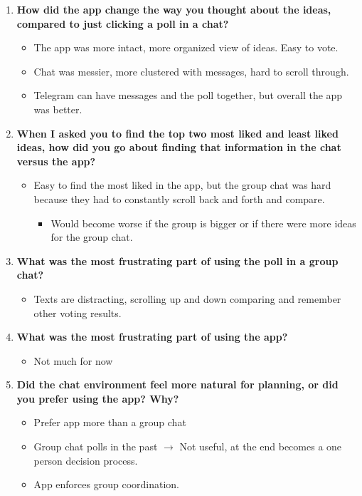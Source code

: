\documentclass[12pt,a4paper]{article}
\begin{document}
\begin{enumerate}
    \item \textbf{How did the app change the way you thought about the ideas, compared to just clicking a poll in a chat?}
    
    \begin{itemize}
        \item The app was more intact, more organized view of ideas. Easy to vote.
        \item Chat was messier, more clustered with messages, hard to scroll through.
        \item Telegram can have messages and the poll together, but overall the app was better.
    \end{itemize}
    
    \item \textbf{When I asked you to find the top two most liked and least liked ideas, how did you go about finding that information in the chat versus the app?}
    
    \begin{itemize}
        \item Easy to find the most liked in the app, but the group chat was hard because they had to constantly scroll back and forth and compare.
        \begin{itemize}
            \item Would become worse if the group is bigger or if there were more ideas for the group chat.
        \end{itemize}
    \end{itemize}
    
    \item \textbf{What was the most frustrating part of using the poll in a group chat?}
    
    \begin{itemize}
        \item Texts are distracting, scrolling up and down comparing and remember other voting results.
    \end{itemize}
    
    \item \textbf{What was the most frustrating part of using the app?}
    
    \begin{itemize}
        \item Not much for now
    \end{itemize}
    
    \item \textbf{Did the chat environment feel more natural for planning, or did you prefer using the app? Why?}
    
    \begin{itemize}
        \item Prefer app more than a group chat
        \item Group chat polls in the past $\rightarrow$ Not useful, at the end becomes a one person decision process.
        \item App enforces group coordination.
    \end{itemize}
\end{enumerate}
\end{document}
